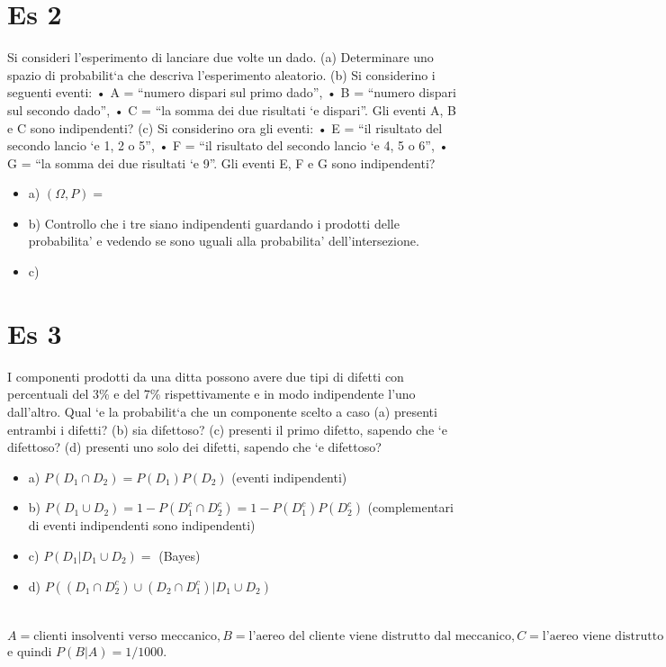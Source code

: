 \documentclass{report}
\begin{document}
\section{Es 2}
Si consideri l’esperimento di lanciare due volte un dado.
(a) Determinare uno spazio di probabilit`a che descriva l’esperimento aleatorio.
(b) Si considerino i seguenti eventi:
• A = “numero dispari sul primo dado”,
• B = “numero dispari sul secondo dado”,
• C = “la somma dei due risultati `e dispari”.
Gli eventi A, B e C sono indipendenti?
(c) Si considerino ora gli eventi:
• E = “il risultato del secondo lancio `e 1, 2 o 5”,
• F = “il risultato del secondo lancio `e 4, 5 o 6”,
• G = “la somma dei due risultati `e 9”.
Gli eventi E, F e G sono indipendenti?

\begin{itemize}
  \item a)  $ (\Omega, P) =  $
  \item b) Controllo che i tre siano indipendenti guardando i prodotti delle probabilita' e vedendo se sono uguali alla probabilita' dell'intersezione.
  \item c) 
\end{itemize}

\section{Es 3}
I componenti prodotti da una ditta possono avere due tipi di difetti con percentuali del 3\% e
del 7\% rispettivamente e in modo indipendente l’uno dall’altro. Qual `e la probabilit`a che un componente
scelto a caso
(a) presenti entrambi i difetti?
(b) sia difettoso?
(c) presenti il primo difetto, sapendo che `e difettoso?
(d) presenti uno solo dei difetti, sapendo che `e difettoso?

\begin{itemize}
  \item a) $ P(D_1 \cap D_2) = P(D_1)P(D_2) $ (eventi indipendenti)
  \item b) $ P(D_1 \cup D_2) = 1 - P(D_1^{c} \cap D_2^{c}) = 1 - P(D_1^{c})P(D_2^{c}) $ (complementari di eventi indipendenti sono indipendenti)
  \item c) $ P(D_1 | D_1 \cup D_2) =  $ (Bayes)
  \item d) $ P((D_1 \cap D_2^{c}) \cup (D_2 \cap D_1^{c}) | D_1 \cup D_2) $
\end{itemize}

\section{}
$ A = \text{clienti insolventi verso meccanico}, B = \text{l'aereo del cliente viene distrutto dal meccanico}, C = \text{l'aereo viene distrutto non dal meccanico} $ e quindi $ P(B|A) = 1/1000 $.
\end{document}
